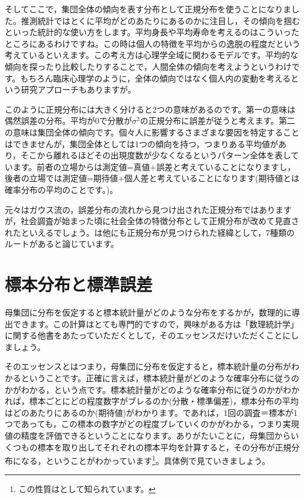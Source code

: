 \documentclass{ltjsbook}
\begin{document}
そしてここで，集団全体の傾向を表す分布として正規分布を使うことになりました。推測統計ではとくに平均がどのあたりにあるのかに注目し，その傾向を掴むといった統計的な使い方をします。平均身長や平均寿命を考えるのはこういったところにあるわけですね。この時は個人の特徴を平均からの逸脱の程度だという考えているといえます。この考え方は心理学全域に関わるモデルです。平均的な傾向を探ったり比較したりすることで，人間全体の傾向を考えようというわけです。もちろん臨床心理学のように，全体の傾向ではなく個人内の変動を考えるという研究アプローチもありますが。

このように正規分布には大きく分けると2つの意味があるのです。第一の意味は偶然誤差の分布。平均が0で分散が$\sigma^2$の正規分布に誤差が従うと考えます。第二の意味は集団全体の傾向です。個々人に影響するさまざまな要因を特定することはできませんが，集団全体としては1つの傾向を持つ，つまりある平均値があり，そこから離れるほどその出現度数が少なくなるというパターン全体を表しています。前者の立場からは測定値=真値+誤差と考えていることになりますし，後者の立場では測定値=期待値+個人差と考えていることになります(期待値とは確率分布の平均のことです。)。

元々はガウス流の，誤差分布の流れから見つけ出された正規分布ではありますが，社会調査が始まった頃に社会全体の特徴分布として正規分布が改めて見直されたといえるでしょう。\textcite{Shiina2013}は他にも正規分布が見つけられた経緯として，7種類のルートがあると論じています。


\section{標本分布と標準誤差}
母集団に分布を仮定すると標本統計量がどのような分布をするかが，数理的に導出できます。この計算はとても専門的ですので，興味がある方は「数理統計学」に関する他書をあたっていただくとして，そのエッセンスだけいただくことにしましょう。

そのエッセンスとはつまり，母集団に分布を仮定すると，標本統計量の分布がわかるということです。正確に言えば，標本統計量がどのような確率分布に従うのかがわかる，という点です。標本統計量がどのような確率分布に従うのかがわかれば，標本ごとにどの程度数字がブレるのか(分散・標準偏差)，標本分布の平均はどのあたりにあるのか(期待値)がわかります。であれば，1回の調査＝標本が1つであっても，この標本の数字がどの程度ブレていくのかがわかる，つまり実現値の精度を評価できるということになります。ありがたいことに，母集団からいくつもの標本を取り出してそれぞれの標本平均を計算すると，その分布が正規分布になる，ということがわかっています\footnote{この性質はとして知られています。}。具体例で見ていきましょう。
\end{document}
